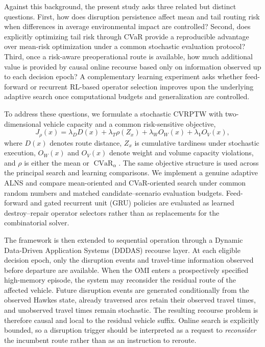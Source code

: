 \documentclass[preprint,12pt]{elsarticle}
\newcommand{\1}{\mathbf{1}}
\begin{document}
Against this background, the present study asks three related but distinct questions.
First, how does disruption persistence affect mean and tail routing risk when differences
in average environmental impact are controlled?
Second, does explicitly optimizing tail risk through CVaR provide a reproducible advantage
over mean-risk optimization under a common stochastic evaluation protocol?
Third, once a risk-aware preoperational route is available, how much additional value is
provided by causal online recourse based only on information observed up to each decision
epoch?
A complementary learning experiment asks whether feed-forward or recurrent RL-based
operator selection improves upon the underlying adaptive search once computational
budgets and generalization are controlled.

To address these questions, we formulate a stochastic CVRPTW with two-dimensional vehicle
capacity and a common risk-sensitive objective,
\[
J_{\rho}(x)
=
\lambda_D D(x)
+
\lambda_T \rho(Z_x)
+
\lambda_W O_W(x)
+
\lambda_V O_V(x),
\]
where $D(x)$ denotes route distance, $Z_x$ is cumulative tardiness under stochastic
execution, $O_W(x)$ and $O_V(x)$ denote weight and volume capacity violations, and
$\rho$ is either the mean or $\operatorname{CVaR}_{\alpha}$.
The same objective structure is used across the principal search and learning
comparisons.
We implement a genuine adaptive ALNS and compare mean-oriented and CVaR-oriented search
under common random numbers and matched candidate--scenario evaluation budgets.
Feed-forward and gated recurrent unit (GRU) policies are evaluated as learned
destroy--repair operator selectors rather than as replacements for the combinatorial
solver.

The framework is then extended to sequential operation through a Dynamic Data-Driven
Application Systems (DDDAS) recourse layer.
At each eligible decision epoch, only the disruption events and travel-time information
observed before departure are available.
When the OMI enters a prospectively specified high-memory episode, the system may
reconsider the residual route of the affected vehicle.
Future disruption events are generated conditionally from the observed Hawkes state,
already traversed arcs retain their observed travel times, and unobserved travel times
remain stochastic.
The resulting recourse problem is therefore causal and local to the residual vehicle
suffix.
Online search is explicitly bounded, so a disruption trigger should be interpreted as a
request to \emph{reconsider} the incumbent route rather than as an instruction to reroute.
\end{document}
